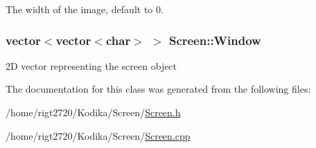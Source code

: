 The width of the image, default to 0. 

\hypertarget{classScreen_a7349f56b4976f03dc9977dc613a8bbab}{
\subsubsection[{Window}]{\setlength{\rightskip}{0pt plus 5cm}vector$<$vector$<$char$>$ $>$ Screen\-::\-Window\hspace{0.3cm}{\ttfamily [protected]}}}\label{classScreen_a7349f56b4976f03dc9977dc613a8bbab}


2\-D vector representing the screen object 



The documentation for this class was generated from the following files\-:\begin{DoxyCompactItemize}
\item 
/home/rigt2720/\-Kodika/\-Screen/\hyperlink{Screen_8h}{Screen.\-h}\item 
/home/rigt2720/\-Kodika/\-Screen/\hyperlink{Screen_8cpp}{Screen.\-cpp}\end{DoxyCompactItemize}
